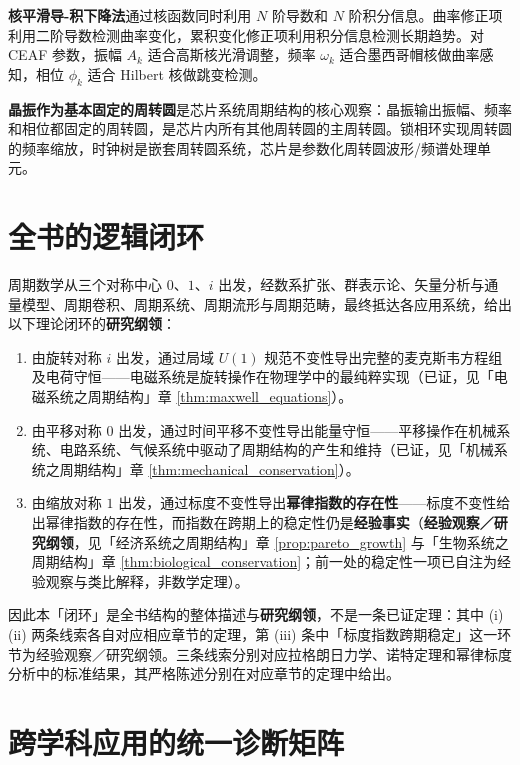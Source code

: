 \textbf{核平滑导-积下降法}通过核函数同时利用 $N$ 阶导数和 $N$ 阶积分信息。曲率修正项利用二阶导数检测曲率变化，累积变化修正项利用积分信息检测长期趋势。对 CEAF 参数，振幅 $A_k$ 适合高斯核光滑调整，频率 $\omega_k$ 适合墨西哥帽核做曲率感知，相位 $\phi_k$ 适合 Hilbert 核做跳变检测。

\textbf{晶振作为基本固定的周转圆}是芯片系统周期结构的核心观察：晶振输出振幅、频率和相位都固定的周转圆，是芯片内所有其他周转圆的主周转圆。锁相环实现周转圆的频率缩放，时钟树是嵌套周转圆系统，芯片是参数化周转圆波形/频谱处理单元。

\section{全书的逻辑闭环}

\begin{remark}\label{thm:closing_loop}
周期数学从三个对称中心 $0$、$1$、$i$ 出发，经数系扩张、群表示论、矢量分析与通量模型、周期卷积、周期系统、周期流形与周期范畴，最终抵达各应用系统，给出以下理论闭环的\textbf{研究纲领}：
\begin{enumerate}[label=(\roman*)]
    \item 由旋转对称 $i$ 出发，通过局域 $U(1)$ 规范不变性导出完整的麦克斯韦方程组及电荷守恒——电磁系统是旋转操作在物理学中的最纯粹实现（已证，见「电磁系统之周期结构」章 \ref{thm:maxwell_equations}）。
    \item 由平移对称 $0$ 出发，通过时间平移不变性导出能量守恒——平移操作在机械系统、电路系统、气候系统中驱动了周期结构的产生和维持（已证，见「机械系统之周期结构」章 \ref{thm:mechanical_conservation}）。
    \item 由缩放对称 $1$ 出发，通过标度不变性导出\textbf{幂律指数的存在性}——标度不变性给出幂律指数的存在性，而指数在跨期上的稳定性仍是\textbf{经验事实}（\textbf{经验观察／研究纲领}，见「经济系统之周期结构」章 \ref{prop:pareto_growth} 与「生物系统之周期结构」章 \ref{thm:biological_conservation}；前一处的稳定性一项已自注为经验观察与类比解释，非数学定理）。
\end{enumerate}
因此本「闭环」是全书结构的整体描述与\textbf{研究纲领}，不是一条已证定理：其中 (i)(ii) 两条线索各自对应相应章节的定理，第 (iii) 条中「标度指数跨期稳定」这一环节为经验观察／研究纲领。三条线索分别对应拉格朗日力学、诺特定理和幂律标度分析中的标准结果，其严格陈述分别在对应章节的定理中给出。
\end{remark}

\section{跨学科应用的统一诊断矩阵}

